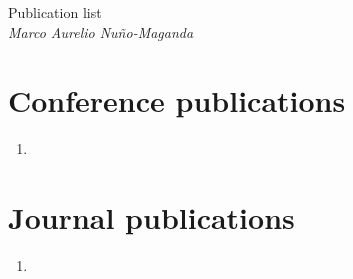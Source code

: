 \documentclass[letterpaper]{article}
\begin{document}
  \begin{flushleft}
 Publication list\\
    \emph{Marco Aurelio Nuño-Maganda}\\[0.5cm]
  \end{flushleft}


  \nocite{*}
  \printbibliography[title = {All my publications}]


  \section*{Conference publications}

  \begin{enumerate}
    \item {}
  \end{enumerate}

  \section*{Journal publications}

  \begin{enumerate}[resume]
    \item {}
  \end{enumerate}
\end{document}
